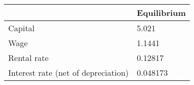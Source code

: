 \begin{tabular}{ll}
& Equilibrium \\ 
\hline 
Capital & 5.021 \\ 
Wage & 1.1441 \\ 
Rental rate & 0.12817 \\ 
Interest rate (net of depreciation) & 0.048173 \\ 
\hline 
\end{tabular}